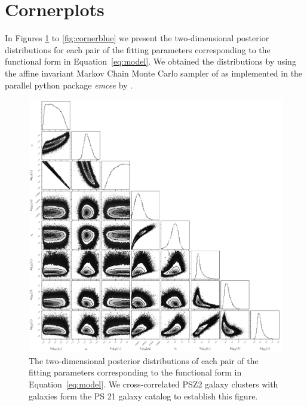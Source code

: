 \documentclass[iop, apjl, twocolappendix, numberedappendix]{emulateapj}
\begin{document}
\section{Cornerplots}
\label{sec:cornerplots}
In Figures \ref{fig:corner_21} to \ref{fig:cornerblue} we present
the two-dimensional posterior distributions for each pair of the
fitting parameters corresponding to the functional
form in Equation~\ref{eq:model}. We obtained the distributions by  using the
affine invariant Markov Chain Monte Carlo sampler of
\citet{goodman2010ensemble} as implemented in the parallel python
package {\it emcee} by \citet{foreman2013emcee}.
\begin{figure}
    \includegraphics[width= \textwidth]{corner21.pdf}
\caption{The two-dimensional posterior distributions of each pair of
the fitting parameters corresponding to the functional
form in Equation~\ref{eq:model}. We cross-correlated PSZ2 galaxy clusters with
galaxies form the PS 21 galaxy catalog to establish this figure.}
   \label{fig:corner_21} 
\end{figure}
\end{document}
